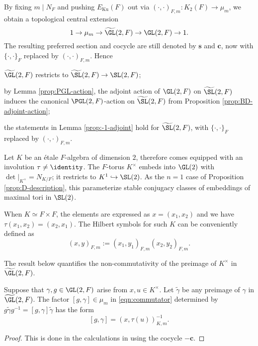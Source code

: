\documentclass[a4paper,10pt]{article}
\begin{document}
By fixing $m \mid N_F$ and pushing $E_\text{Ku}(F)$ out via $(\cdot, \cdot)_{F,m}: K_2(F) \to \mu_m$, we obtain a topological central extension
\[ 1 \to \mu_m \to \widetilde{\GL}(2,F) \to \GL(2,F) \to 1. \]
The resulting preferred section and cocycle are still denoted by $\mathbf{s}$ and $\bm{c}$, now with $\{\cdot, \cdot \}_F$ replaced by $(\cdot, \cdot)_{F,m}$. Hence
\begin{compactitem}
	\item $\widetilde{\GL}(2,F)$ restricts to $\widetilde{\SL}(2,F) \to \SL(2,F)$;
	\item by Lemma \ref{prop:PGL-action}, the adjoint action of $\GL(2,F)$ on $\widetilde{\SL}(2,F)$ induces the canonical $\PGL(2,F)$-action on $\widetilde{\SL}(2,F)$ from Proposition \ref{prop:BD-adjoint-action};
	\item the statements in Lemma \ref{prop:-1-adjoint} hold for $\widetilde{\SL}(2,F)$, with $\{\cdot,\cdot\}_F$ replaced by $( \cdot, \cdot)_{F,m}$.
\end{compactitem}

Let $K$ be an étale $F$-algebra of dimension $2$, therefore comes equipped with an involution $\tau \neq \identity$. The $F$-torus $K^\times$ embeds into $\GL(2)$ with $\det|_{K^\times} = N_{K/F}$; it restricts to $K^1 \hookrightarrow \SL(2)$. As the $n=1$ case of Proposition \ref{prop:D-description}, this parameterize stable conjugacy classes of embeddings of maximal tori in $\SL(2)$.

\begin{notation}
	When $K \simeq F \times F$, the elements are expressed as $x = (x_1, x_2)$ and we have $\tau(x_1, x_2) = (x_2, x_1)$. The Hilbert symbols for such $K$ can be conveniently defined as
	\[ (x,y)_{F,m} := (x_1, y_1)_{F,m} (x_2, y_2)_{F,m}. \]
\end{notation}

The result below quantifies the non-commutativity of the preimage of $K^\times$ in $\widetilde{\GL}(2,F)$.
\begin{proposition}[Flicker]\label{prop:Flicker-comm}
	Suppose that $\gamma, g \in \GL(2,F)$ arise from $x, u \in K^\times$. Let $\tilde{\gamma}$ be any preimage of $\gamma$ in $\widetilde{\GL}(2,F)$. The factor $[g,\gamma] \in \mu_m$ in \eqref{eqn:commutator} determined by $g\tilde{\gamma}g^{-1} = [g, \gamma] \tilde{\gamma}$ has the form
	\[ [g,\gamma] = (x, \tau(u))_{K,m}^{-1}. \]
\end{proposition}
\begin{proof}
	This is done in the calculations in \cite[p.128]{Fl80} using the cocycle $-\bm{c}$.
\end{proof}
\end{document}
